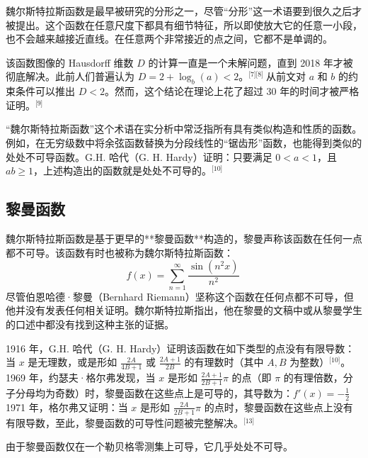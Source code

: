 魏尔斯特拉斯函数是最早被研究的分形之一，尽管“分形”这一术语要到很久之后才被提出。这个函数在任意尺度下都具有细节特征，所以即使放大它的任意一小段，也不会越来越接近直线。在任意两个非常接近的点之间，它都不是单调的。

该函数图像的 Hausdorff 维数 $D$ 的计算一直是一个未解问题，直到 2018 年才被彻底解决。此前人们普遍认为 $D = 2 + \log_b(a) < 2$。\(^\text{[7][8] }\)从前文对 $a$ 和 $b$ 的约束条件可以推出 $D < 2$。然而，这个结论在理论上花了超过 30 年的时间才被严格证明。\(^\text{[9]}\)

“魏尔斯特拉斯函数”这个术语在实分析中常泛指所有具有类似构造和性质的函数。例如，在无穷级数中将余弦函数替换为分段线性的“锯齿形”函数，也能得到类似的处处不可导函数。G.H. 哈代（G. H. Hardy）证明：只要满足 $0 < a < 1$，且 $ab \geq 1$，上述构造出的函数就是处处不可导的。\(^\text{[10]}\)
\subsection{黎曼函数}
魏尔斯特拉斯函数是基于更早的**黎曼函数**构造的，黎曼声称该函数在任何一点都不可导。该函数有时也被称为魏尔斯特拉斯函数：
$$
f(x) = \sum_{n=1}^{\infty} \frac{\sin(n^2 x)}{n^2}~
$$
尽管伯恩哈德·黎曼（Bernhard Riemann）坚称这个函数在任何点都不可导，但他并没有发表任何相关证明。魏尔斯特拉斯指出，他在黎曼的文稿中或从黎曼学生的口述中都没有找到这种主张的证据。

1916 年，G.H. 哈代（G. H. Hardy）证明该函数在如下类型的点没有有限导数：当 $x$ 是无理数，或是形如 $\frac{2A}{4B+1}$ 或 $\frac{2A+1}{2B}$ 的有理数时（其中 $A, B$ 为整数）\(^\text{[10]}\)。1969 年，约瑟夫·格尔弗发现，当 $x$ 是形如 $\frac{2A+1}{2B+1}\pi$ 的点（即 $\pi$ 的有理倍数，分子分母均为奇数）时，黎曼函数在这些点上是可导的，其导数为：$f'(x) = -\frac{1}{2}$1971 年，格尔弗又证明：当 $x$ 是形如 $\frac{2A}{2B+1}\pi$ 的点时，黎曼函数在这些点上没有有限导数，至此，黎曼函数的可导性问题被完整解决。\(^\text{[13]}\)

由于黎曼函数仅在一个勒贝格零测集上可导，它几乎处处不可导。
